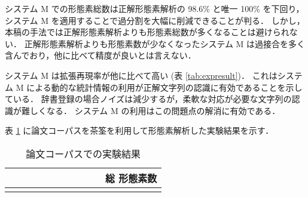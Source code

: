 システム M での形態素総数は正解形態素解析の 98.6\% と唯一 100\% を下回り，システム M を適用することで過分割を大幅に削減できることが判る．
しかし，
本稿の手法では正解形態素解析よりも形態素総数が多くなることは避けられない．
正解形態素解析よりも形態素数が少なくなったシステム M は過接合を多く含んでおり，他に比べて精度が良いとは言えない．

システム M は拡張再現率が他に比べて高い (表 \ref{tab:expresult})．
これはシステム M による動的な統計情報の利用が正解文字列の認識に有効であることを示している．
辞書登録の場合ノイズは減少するが，柔軟な対応が必要な文字列の認識が難しくなる．
システム M の利用はこの問題点の解消に有効である．

表 \ref{tab:paperresultpos} に論文コーパスを茶筌を利用して形態素解析した実験結果を示す．
\begin{table}[hbt]
\begin{small}
\begin{center}
\caption{論文コーパスでの実験結果}
\label{tab:paperresultpos}
\begin{tabular}{l|rrrrrrrrr|r}
&\hspace{-2pt}{\footnotesize 未知語}&\hspace{-2pt}{\footnotesize 有繋
文字列}&\hspace{-2pt}{\footnotesize 名詞}&\hspace{-2pt}{\footnotesize 
動詞}&\hspace{-2pt}{\footnotesize 副詞}&\hspace{-2pt}{\footnotesize 形
容詞}&\hspace{-2pt}{\footnotesize 助動詞}&\hspace{-2pt}{\footnotesize 
助詞}&\hspace{-2pt}{\footnotesize 記号}&{\footnotesize 総
形態素数}\\
\hline
\hline
\hspace{-3pt}{\footnotesize 茶筌のみ}&\hspace{-2pt}{\footnotesize 483}&\hspace{-2pt}{\footnotesize
---}&\hspace{-2pt}{\footnotesize 12,863}&\hspace{-2pt}{\footnotesize
3,892}&\hspace{-2pt}{\footnotesize 213}&\hspace{-2pt}{\footnotesize
364}&\hspace{-2pt}{\footnotesize 1,777}&\hspace{-2pt}{\footnotesize
8,499}&\hspace{-2pt}{\footnotesize 4,445}&\hspace{-2pt}{\footnotesize
}
\end{tabular}
\end{center}
\end{small}
\end{table}
